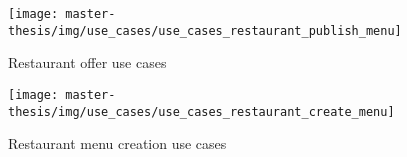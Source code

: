 
\begin{figure}[h]
  \centering
  \texttt{[image: master-thesis/img/use\_cases/use\_cases\_restaurant\_publish\_menu]}
  \caption{Restaurant offer use cases}
\end{figure}

\begin{figure}[h]
  \centering
  \texttt{[image: master-thesis/img/use\_cases/use\_cases\_restaurant\_create\_menu]}
  \caption{Restaurant menu creation use cases}
\end{figure}

